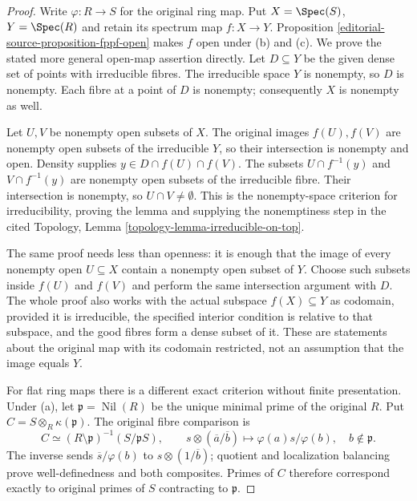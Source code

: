 \begin{proof}
Write $\varphi:R\to S$ for the original
ring map. Put $X=\Spec(S)$, $Y=\Spec(R)$
and retain its spectrum map $f:X\to Y$. Proposition
\ref{editorial-source-proposition-fppf-open} makes $f$ open
under (b) and (c). We prove the stated
more general open-map assertion directly.
Let $D\subseteq Y$ be the given dense
set of points with irreducible fibres.
The irreducible space $Y$ is nonempty,
so $D$ is nonempty. Each fibre at a
point of $D$ is nonempty; consequently
$X$ is nonempty as well.

Let $U,V$ be nonempty open subsets of
$X$. The original images $f(U),f(V)$
are nonempty open subsets of the
irreducible $Y$, so their intersection
is nonempty and open. Density supplies
$y\in D\cap f(U)\cap f(V)$.
The subsets $U\cap f^{-1}(y)$ and
$V\cap f^{-1}(y)$ are nonempty open
subsets of the irreducible fibre.
Their intersection is nonempty,
so $U\cap V\neq\emptyset$.
This is the nonempty-space criterion
for irreducibility, proving the lemma
and supplying the nonemptiness step
in the cited Topology, Lemma
\ref{topology-lemma-irreducible-on-top}.

The same proof needs less than
openness: it is enough that the
image of every nonempty open
$U\subseteq X$ contain a nonempty
open subset of $Y$. Choose such
subsets inside $f(U)$ and $f(V)$
and perform the same intersection
argument with $D$. The whole proof
also works with the actual subspace
$f(X)\subseteq Y$ as codomain,
provided it is irreducible, the
specified interior condition is
relative to that subspace, and
the good fibres form a dense
subset of it. These are statements
about the original map with its
codomain restricted, not an
assumption that the image equals $Y$.

For flat ring maps there is a
different exact criterion without
finite presentation. Under (a),
let $\mathfrak p=\operatorname{Nil}(R)$
be the unique minimal prime of
the original $R$. Put
$C=S\otimes_R\kappa(\mathfrak p)$.
The original fibre comparison is
$$
C\simeq(R\setminus\mathfrak p)^{-1}(S/\mathfrak pS),
\qquad
s\otimes(\overline a/\overline b)
\longmapsto\varphi(a)s/\varphi(b),
\quad b\notin\mathfrak p.
$$
The inverse sends $\overline s/\varphi(b)$
to $s\otimes(1/\overline b)$;
quotient and localization balancing
prove well-definedness and both
composites. Primes of $C$ therefore
correspond exactly to original
primes of $S$ contracting to
$\mathfrak p$.


\end{proof}
